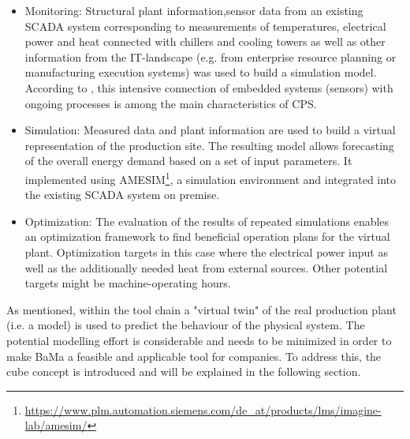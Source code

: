 \documentclass[3p,times,procedia,twocolumn,twoside]{elsarticle}
\begin{document}
\begin{itemize}
	\item{Monitoring: Structural plant information,\linebreak sensor data from an existing SCADA system corresponding to measurements of temperatures, electrical power and heat connected with chillers and cooling towers as well as other information from the IT-landscape (e.g. from enterprise resource planning or manufacturing execution systems) was used to build a simulation model. According to \cite{monostori_cyber-physical_2014}, this intensive connection of embedded systems (sensors) with ongoing processes is among the main characteristics of CPS.}
	\item{Simulation: Measured data and plant information are used to build a virtual representation of the production site. The resulting model allows forecasting of the overall energy demand based on a set of input parameters. It implemented using AMESIM\footnote{\url{https://www.plm.automation.siemens.com/de_at/products/lms/imagine-lab/amesim/}}, a simulation environment and integrated into the existing SCADA system on premise.}
	\item{Optimization: The evaluation of the results of repeated simulations enables an optimization framework to find beneficial operation plans for the virtual plant. Optimization targets in this case where the electrical power input as well as the additionally needed heat from external sources. Other potential targets might be machine-operating hours.}
\end{itemize}
As mentioned, within the tool chain a "virtual twin" of the real production plant (i.e. a model) is used to predict the behaviour of the physical system. The potential modelling effort is considerable and needs to be minimized in order to make BaMa a feasible and applicable tool for companies. To address this, the cube concept is introduced and will be explained in the following section.
\end{document}
